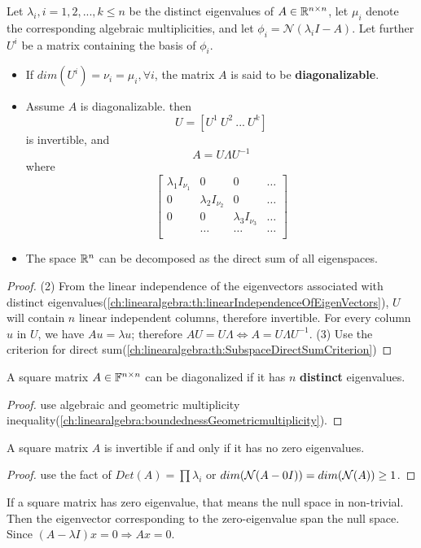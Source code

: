 \begin{refsection}
\begin{theorem}Let $\lambda_i,i=1,2,...,k \leq n$ be the distinct eigenvalues of $A\in \mathbb{R}^{n\times n}$, let $\mu_i$ denote the corresponding algebraic multiplicities, and let $\phi_i = \mathcal{N}(\lambda_i I - A)$. Let further $U^i $ be a matrix containing the basis of $\phi_i$.
\begin{itemize}
	\item  If $dim(U^i)=\nu_i=\mu_i, \forall i$, the matrix $A$ is said to be \textbf{diagonalizable}.
	\item Assume $A$ is diagonalizable. then
	$$U=[U^1 ~U^2~ ... ~U^k]$$
	is invertible, and $$A = U\Lambda U^{-1}$$
	where 
	\[\begin{bmatrix}
	\lambda_1 I_{\nu_{1}} &0&0&\dots\\
	0&\lambda_2 I_{\nu_{2}}&0&\dots\\
	0&0&\lambda_3 I_{\nu_{3}}&\dots\\
	&\dots&\dots&\dots\\
	\end{bmatrix}\]
	\item The space $\mathbb{R}^n$ can be decomposed as the direct sum of all eigenspaces. 
\end{itemize}
\end{theorem}
\begin{proof}
(2) From the linear independence of the eigenvectors associated with distinct eigenvalues(\autoref{ch:linearalgebra:th:linearIndependenceOfEigenVectors}), $U$ will contain $n$ linear independent columns, therefore invertible. For every column $u$ in $U$, we have
$Au = \lambda u$; therefore $AU = U\Lambda \Leftrightarrow A = U\Lambda U^{-1}$.	
(3) Use the criterion for direct sum(\autoref{ch:linearalgebra:th:SubspaceDirectSumCriterion})
\end{proof}

\begin{lemma}
	A square matrix $A\in \mathbb{F}^{n\times n}$ can be diagonalized if it has $n$ \textbf{distinct} eigenvalues.
\end{lemma}
\begin{proof}
	use algebraic and geometric multiplicity inequality(\autoref{ch:linearalgebra:boundednessGeometricmultiplicity}).
\end{proof}



\begin{lemma}
A square matrix $A$ is invertible if and only if it has no zero eigenvalues.
\end{lemma}
\begin{proof}
use the fact of $Det(A) = \prod \lambda_i$ or $dim(\mathcal{N}(A - 0I)) = dim(\mathcal{N}(A)) 
\geq 1$.
\end{proof}
\begin{remark}
	If a square matrix has zero eigenvalue, that means the null space in non-trivial. Then the eigenvector corresponding to the zero-eigenvalue span the null space. Since $(A-\lambda I) x = 0 \Rightarrow Ax = 0$.
\end{remark}



\end{refsection}
